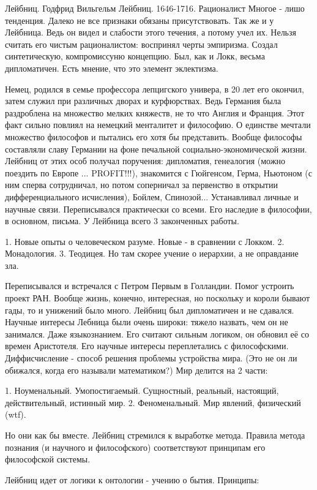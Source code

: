 Лейбниц. Годфрид Вильгельм Лейбниц. 1646-1716. Рационалист
Многое - лишо тенденция. Далеко не все признаки обязаны присутствовать. Так же и у Лейбница. Ведь он видел и слабости этого течения, а потому учел их. Нельзя считать его чистым рационалистом: воспринял черты эмпиризма. Создал синтетическую, компромиссуню концепцию. Был, как и Локк, весьма дипломатичен. Есть мнение, что это элемент эклектизма.

Немец, родился в семье профессора лепцигского универа, в 20 лет его окончил, затем служил при различных дворах и курфюрствах. Ведь Германия была раздроблена на множество мелких княжеств, не то что Англия и Франция. Этот факт сильно повлиял на немецкий менталитет и философию. О единстве мечтали множество философов и пытались его хотя бы представить. Вообще философы составляли славу Германии на фоне печальной социально-экономической жизни. Лейбниц от этих особ получал поручения: дипломатия, генеалогия (можно поездить по Европе ... PROFIT!!!), знакомится с Гюйгенсом, Герма, Ньютоном (с ним сперва сотрудничал, но потом соперничал за первенство в открытии дифференциального исчисления), Бойлем, Спинозой... Устанавливал личные и научные связи. Переписывался практически со всеми. Его наследие в философии, в основном, письма. У Лейбница всего 3 законченных работы.

	1. Новые опыты о человеческом разуме. Новые - в сравнении с Локком.
	2. Монадология.
	3. Теодицея. Но там скорее учение о иерархии, а не оправдание зла.

Переписывался и встречался с Петром Первым в Голландии. Помог устроить проект РАН. Вообще жизнь, конечно, интересная, но поскольку и короли бывают гады, то и унижений было много. Лейбниц был дипломатичен и не сдавался.
Научные интересы Лебница были очень широки: тяжело назвать, чем он не занимался. Даже языкознанием. Его считают сильным логиком, он обновил её со времен Аристотеля. Его научные интересы переплетались с философскими. Диффисчисление - способ решения проблемы устройства мира. (Это не он ли обижался, когда его называли математиком?)
Мир делится на 2 части: 

	1. Ноуменальный. Умопостигаемый. Сущностный, реальный, настоящий, действительный, истинный мир.
	2. Феноменальный. Мир явлений, физический (wtf).

Но они как бы вместе. Лейбниц стремился к выработке метода. Правила метода познания (и научного и философского) соответствуют принципам его философской системы.

Лейбниц идет от логики к онтологии - учению о бытия. Принципы:

